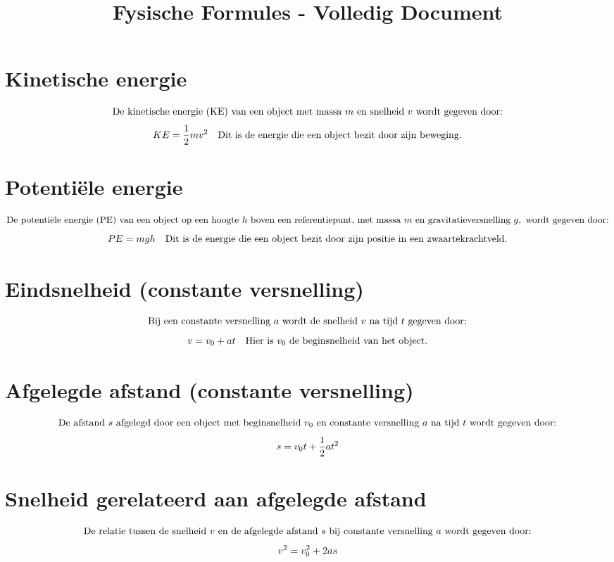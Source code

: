 \documentclass{article}
\title{Fysische Formules - Volledig Document}
\author{}
\date{}
\begin{document}
\maketitle

\section*{Kinetische energie}
\[ \text{De kinetische energie (KE) van een object met massa } m \text{ en snelheid } v \text{ wordt gegeven door:} \\
\]
\[ KE = \frac{1}{2} mv^2 \quad \text{Dit is de energie die een object bezit door zijn beweging.} \\
\]

\section*{Potentiële energie}
\[ \text{De potentiële energie (PE) van een object op een hoogte } h \text{ boven een referentiepunt, met massa } m \text{ en gravitatieversnelling } g, \text{ wordt gegeven door:} \\
\]
\[ PE = mgh \quad \text{Dit is de energie die een object bezit door zijn positie in een zwaartekrachtveld.} \\
\]

\section*{Eindsnelheid (constante versnelling)}
\[ \text{Bij een constante versnelling } a \text{ wordt de snelheid } v \text{ na tijd } t \text{ gegeven door:} \\
\]
\[ v = v_0 + at \quad \text{Hier is } v_0 \text{ de beginsnelheid van het object.} \\
\]

\section*{Afgelegde afstand (constante versnelling)}
\[ \text{De afstand } s \text{ afgelegd door een object met beginsnelheid } v_0 \text{ en constante versnelling } a \text{ na tijd } t \text{ wordt gegeven door:} \\
\]
\[ s = v_0 t + \frac{1}{2} at^2 \\
\]

\section*{Snelheid gerelateerd aan afgelegde afstand}
\[ \text{De relatie tussen de snelheid } v \text{ en de afgelegde afstand } s \text{ bij constante versnelling } a \text{ wordt gegeven door:} \\
\]
\[ v^2 = v_0^2 + 2as \\
\]
\end{document}
